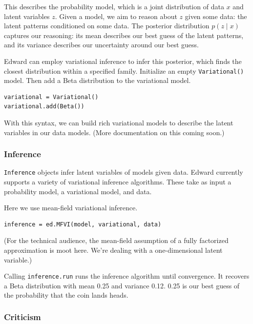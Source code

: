 This describes the probability model, which is a joint distribution of data $x$
and latent variables $z$. Given a model, we aim to reason about $z$ given some
data: the latent patterns conditioned on some data. The posterior distribution
$p(z \mid x)$ captures our reasoning: its mean describes our best guess of the
latent patterns, and its variance describes our uncertainty around our best
guess. 

Edward can employ variational inference to infer this posterior, which
finds the closest distribution within a specified family. Initialize an
empty \texttt{Variational()} model. Then add a Beta distribution to the
variational model.

\begin{verbatim}
variational = Variational()
variational.add(Beta())
\end{verbatim}

With this syntax, we can build rich variational models to describe the
latent variables in our data models. (More documentation on this coming
soon.)

\subsubsection{Inference}\label{inference}

\texttt{Inference} objects infer latent variables of models given data.
Edward currently supports a variety of variational inference algorithms.
These take as input a probability model, a variational model, and data.

Here we use mean-field variational inference.

\begin{verbatim}
inference = ed.MFVI(model, variational, data)
\end{verbatim}

(For the technical audience, the mean-field assumption of a fully
factorized approximation is moot here. We're dealing with a
one-dimensional latent variable.)

Calling \texttt{inference.run} runs the inference algorithm until
convergence. It recovers a Beta distribution with mean 0.25 and variance
0.12. 0.25 is our best guess of the probability that the coin lands
heads.

\subsubsection{Criticism}\label{criticism}

